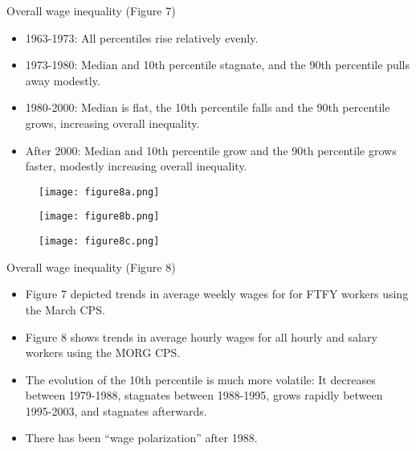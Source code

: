 \documentclass[notes=show]{beamer}
\begin{document}
\begin{frame}{Overall wage inequality (Figure 7)}
\begin{itemize}
\item 1963-1973: All percentiles rise relatively evenly. \medskip 
\item 1973-1980: Median and 10th percentile stagnate, and the 90th percentile pulls away modestly. \medskip
\item 1980-2000: Median is flat, the 10th percentile falls and the 90th percentile grows, increasing overall inequality. \medskip
\item After 2000: Median and 10th percentile grow and the 90th percentile grows faster, modestly increasing overall inequality.
\end{itemize}
\end{frame}

\newpage
\begin{center}
\begin{figure}
\texttt{[image: figure8a.png]}
\end{figure} 
\end{center}
\newpage

\newpage
\begin{center}
\begin{figure}
\texttt{[image: figure8b.png]}
\end{figure} 
\end{center}
\newpage

\newpage
\begin{center}
\begin{figure}
\texttt{[image: figure8c.png]}
\end{figure} 
\end{center}
\newpage

\begin{frame}{Overall wage inequality (Figure 8)}
\begin{itemize}
\item Figure 7 depicted trends in average weekly wages for for FTFY workers using the March CPS. \medskip
\item Figure 8 shows trends in average hourly wages for all hourly and salary workers using the MORG CPS. \medskip
\item The evolution of the 10th percentile is much more volatile: It decreases between 1979-1988, stagnates between 1988-1995, grows rapidly between 1995-2003, and stagnates afterwards. \medskip 
\item There has been ``wage polarization'' after 1988.
\end{itemize}
\end{frame}
\end{document}

